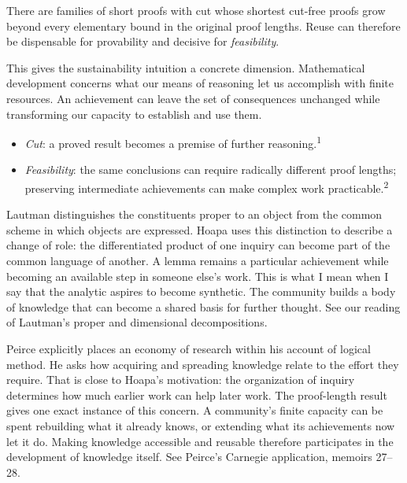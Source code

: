 \documentclass[a4paper,10pt]{article}
\newcommand{\marked}[1]{\par\addvspace{2pt}{\bfseries #1}\par\nopagebreak}
\renewenvironment{leftbar}{%
  \def\FrameCommand{{\color{black!30}\vrule width 1.2pt}\hspace{6pt}}%
  \MakeFramed{\advance\hsize-\width \FrameRestore}}{\endMakeFramed}
\newenvironment{commentary}{\par\vspace{-2pt}\begin{leftbar}\color{black!80}}{\end{leftbar}}
\begin{document}
There are families of short proofs with cut whose shortest cut-free proofs grow beyond every elementary bound in the original proof lengths. Reuse can therefore be dispensable for provability and decisive for \textcolor{feasibilitysienna}{\emph{feasibility}}.\par
This gives the sustainability intuition a concrete dimension. Mathematical development concerns what our means of reasoning let us accomplish with finite resources. An achievement can leave the set of consequences unchanged while transforming our capacity to establish and use them.\par
\begin{itemize}
\item \textcolor{replayolive}{\emph{Cut}}: a proved result becomes a premise of further reasoning.\textsuperscript{1}
\item \textcolor{feasibilitysienna}{\emph{Feasibility}}: the same conclusions can require radically different proof lengths; preserving intermediate achievements can make complex work practicable.\textsuperscript{2}
\end{itemize}
\begin{commentary}
\marked{\textcolor{replayolive}{Cut}}
Lautman distinguishes the constituents proper to an object from the common scheme in which objects are expressed. Hoapa uses this distinction to describe a change of role: the differentiated product of one inquiry can become part of the common language of another. A lemma remains a particular achievement while becoming an available step in someone else's work. This is what I mean when I say that the analytic aspires to become synthetic. The community builds a body of knowledge that can become a shared basis for further thought. See our reading of Lautman's proper and dimensional decompositions.\par
\marked{\textcolor{feasibilitysienna}{Feasibility}}
Peirce explicitly places an economy of research within his account of logical method. He asks how acquiring and spreading knowledge relate to the effort they require. That is close to Hoapa's motivation: the organization of inquiry determines how much earlier work can help later work. The proof-length result gives one exact instance of this concern. A community's finite capacity can be spent rebuilding what it already knows, or extending what its achievements now let it do. Making knowledge accessible and reusable therefore participates in the development of knowledge itself. See Peirce's Carnegie application, memoirs 27–28.\par
\end{commentary}
\end{document}
